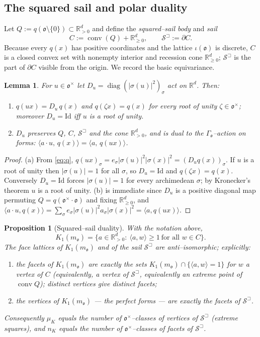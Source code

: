\documentclass[11pt,reqno]{amsart}
\theoremstyle{plain}
\newtheorem{proposition}[theorem]{Proposition}
\newtheorem{lemma}[theorem]{Lemma}
\theoremstyle{definition}
\newcommand{\R}{\mathbb{R}}
\newcommand{\conv}{\operatorname{conv}}
\newcommand{\sail}{\mathcal{S}^{\sqsupset}}
\newcommand{\Ok}{\mathfrak{o}}
\newcommand{\bdy}{\partial}
\newcommand{\nK}{n_K}
\newcommand{\muK}{\mu_K}
\begin{document}
\subsection{The squared sail and polar duality}
Let $Q:=q(\Ok\setminus\{0\})\subset\R^d_{>0}$ and define the \emph{squared--sail body} and \emph{sail}
\[
C:=\conv(Q)+\R^d_{\ge0},\qquad \sail:=\bdy C .
\]
Because every $q(x)$ has positive coordinates and the lattice $\iota(\Ok)$ is discrete, $C$ is a closed
convex set with nonempty interior and recession cone $\R^d_{\ge0}$; $\sail$ is the part of $\bdy C$ visible
from the origin. We record the basic equivariance.

\begin{lemma}\label{lem:hadamard}
For $u\in\Ok^\times$ let $D_u=\operatorname{diag}(|\sigma(u)|^2)_\sigma$ act on $\R^d$. Then:
\begin{enumerate}[label=\textup{(\alph*)},leftmargin=2.2em]
\item $q(ux)=D_u\,q(x)$ and $q(\zeta x)=q(x)$ for every root of unity $\zeta\in\Ok^\times$; moreover
$D_u=\mathrm{Id}$ iff $u$ is a root of unity.
\item $D_u$ preserves $Q$, $C$, $\sail$ and the cone $\R^d_{>0}$, and is dual to the $\Gamma_\Ok$--action on
forms: $\langle a\cdot u,\,q(x)\rangle=\langle a,\,q(ux)\rangle$.
\end{enumerate}
\end{lemma}

\begin{proof}
(a) From \eqref{eq:q}, $q(ux)_\sigma=e_\sigma|\sigma(u)|^2|\sigma(x)|^2=(D_uq(x))_\sigma$. If $u$ is a root
of unity then $|\sigma(u)|=1$ for all $\sigma$, so $D_u=\mathrm{Id}$ and $q(\zeta x)=q(x)$. Conversely
$D_u=\mathrm{Id}$ forces $|\sigma(u)|=1$ for every archimedean $\sigma$; by Kronecker's theorem $u$ is a root
of unity. (b) is immediate since $D_u$ is a positive diagonal map permuting $Q=q(\Ok^\times\cdot\Ok)$ and
fixing $\R^d_{\ge0}$, and $\langle a\cdot u,q(x)\rangle=\sum_\sigma e_\sigma|\sigma(u)|^2a_\sigma|\sigma(x)|^2
=\langle a,q(ux)\rangle$.
\end{proof}

\begin{proposition}[Squared--sail duality]\label{prop:duality}
With the notation above,
\[
K_1(m_\Ok)=\{a\in\R^d_{>0}:\ \langle a,w\rangle\ge1\ \text{for all }w\in C\}.
\]
The face lattices of $K_1(m_\Ok)$ and of the sail $\sail$ are anti--isomorphic; explicitly:
\begin{enumerate}[label=\textup{(\roman*)},leftmargin=2.2em]
\item the facets of $K_1(m_\Ok)$ are exactly the sets $K_1(m_\Ok)\cap\{\langle a,w\rangle=1\}$ for $w$ a
vertex of $C$ (equivalently, a vertex of $\sail$, equivalently an extreme point of $\conv Q$); distinct
vertices give distinct facets;
\item the vertices of $K_1(m_\Ok)$ --- the perfect forms --- are exactly the facets of $\sail$.
\end{enumerate}
Consequently $\muK$ equals the number of $\Ok^\times$--classes of vertices of $\sail$ (\emph{extreme
squares}), and $\nK$ equals the number of $\Ok^\times$--classes of facets of $\sail$.
\end{proposition}
\end{document}
